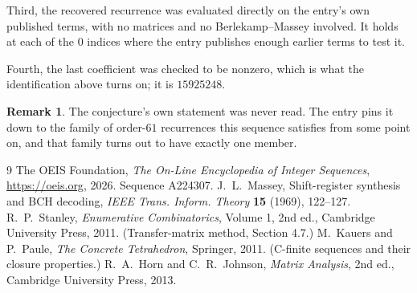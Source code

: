 \documentclass[11pt,a4paper]{article}
\theoremstyle{plain}
\theoremstyle{definition}
\newtheorem{remark}[theorem]{Remark}
\begin{document}
Third, the recovered recurrence was evaluated directly on the entry's own published terms, with
no matrices and no Berlekamp--Massey involved. It holds at each of the $0$ indices where
the entry publishes enough earlier terms to test it.

Fourth, the last coefficient was checked to be nonzero, which is what the identification above
turns on; it is $15925248$.

\begin{remark}
The conjecture's own statement was never read. The entry pins it down to the family of
order-$61$ recurrences this sequence satisfies from some point on, and that family turns
out to have exactly one member.
\end{remark}

\begin{thebibliography}{9}
 The OEIS Foundation, \emph{The On-Line Encyclopedia of Integer
Sequences}, \url{https://oeis.org}, 2026. Sequence A224307.
 J.~L.~Massey, Shift-register synthesis and BCH decoding, \emph{IEEE
Trans. Inform. Theory} \textbf{15} (1969), 122--127.
 R.~P.~Stanley, \emph{Enumerative Combinatorics}, Volume 1, 2nd ed.,
Cambridge University Press, 2011. (Transfer-matrix method, Section 4.7.)
 M.~Kauers and P.~Paule, \emph{The Concrete Tetrahedron}, Springer, 2011.
(C-finite sequences and their closure properties.)
 R.~A.~Horn and C.~R.~Johnson, \emph{Matrix Analysis}, 2nd ed., Cambridge
University Press, 2013.
\end{thebibliography}
\end{document}
